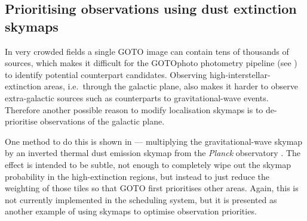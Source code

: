 \subsection{Prioritising observations using dust extinction skymaps}
\label{sec:extinction_skymaps}
\begin{colsection}

In very crowded fields a single GOTO image can contain tens of thousands of sources, which makes it difficult for the GOTOphoto photometry pipeline (see ) to identify potential counterpart candidates. Observing high-interstellar-extinction areas, i.e.\ through the galactic plane, also makes it harder to observe extra-galactic sources such as counterparts to gravitational-wave events. Therefore another possible reason to modify localisation skymaps is to de-prioritise observations of the galactic plane.

One method to do this is shown in  --- multiplying the gravitational-wave skymap by an inverted thermal dust emission skymap from the \textit{Planck} observatory \citep{Planck_dust}. The effect is intended to be subtle, not enough to completely wipe out the skymap probability in the high-extinction regions, but instead to just reduce the weighting of those tiles so that GOTO first prioritises other areas. Again, this is not currently implemented in the scheduling system, but it is presented as another example of using skymaps to optimise observation priorities.


\end{colsection}
